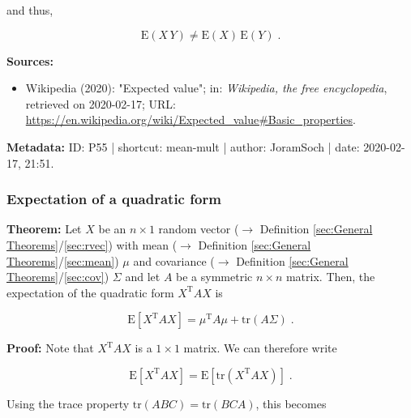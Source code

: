 \documentclass[a4paper,12pt,twoside]{book}
\begin{document}
and thus,

\begin{equation} \label{eq:mean-mult-mean-nonmult-qed}
\mathrm{E}(X\,Y) \neq \mathrm{E}(X) \, \mathrm{E}(Y) \; .
\end{equation}


\vspace{1em}
\textbf{Sources:}
\begin{itemize}
\item Wikipedia (2020): "Expected value"; in: \textit{Wikipedia, the free encyclopedia}, retrieved on 2020-02-17; URL: \url{https://en.wikipedia.org/wiki/Expected_value#Basic_properties}.
\end{itemize}


\vspace{1em}
\textbf{Metadata:} ID: P55 | shortcut: mean-mult | author: JoramSoch | date: 2020-02-17, 21:51.
\vspace{1em}



\subsubsection[\textbf{Expectation of a quadratic form}]{Expectation of a quadratic form} \label{sec:mean-qf}
\setcounter{equation}{0}

\textbf{Theorem:} Let $X$ be an $n \times 1$ random vector ($\rightarrow$ Definition \ref{sec:General Theorems}/\ref{sec:rvec}) with mean ($\rightarrow$ Definition \ref{sec:General Theorems}/\ref{sec:mean}) $\mu$ and covariance ($\rightarrow$ Definition \ref{sec:General Theorems}/\ref{sec:cov}) $\Sigma$ and let $A$ be a symmetric $n \times n$ matrix. Then, the expectation of the quadratic form $X^\mathrm{T} A X$ is

\begin{equation} \label{eq:mean-qf-mean-qf}
\mathrm{E}\left[ X^\mathrm{T} A X \right] = \mu^\mathrm{T} A \mu + \mathrm{tr}(A \Sigma) \; .
\end{equation}


\vspace{1em}
\textbf{Proof:} Note that $X^\mathrm{T} A X$ is a $1 \times 1$ matrix. We can therefore write

\begin{equation} \label{eq:mean-qf-mean-qf-s1}
\mathrm{E}\left[ X^\mathrm{T} A X \right] =  \mathrm{E}\left[ \mathrm{tr} \left( X^\mathrm{T} A X \right) \right] \; .
\end{equation}

Using the trace property $\mathrm{tr}(ABC) = \mathrm{tr}(BCA)$, this becomes
\end{document}

